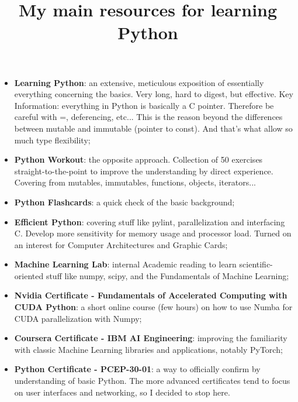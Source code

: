 \documentclass[10pt]{article}
\title {My main resources for learning Python}
\begin{document}
\maketitle

\begin{itemize}

\item{\textbf{Learning Python}}:
an extensive, meticulous exposition of essentially everything concerning
the basics. Very long, hard to digest, but effective.
Key Information: everything in Python is basically a C pointer.
Therefore be careful with =, deferencing, etc...
This is the reason beyond the differences between mutable and
immutable (pointer to const).
And that's what allow so much type flexibility;

\item{\textbf{Python Workout}}:
the opposite approach. Collection of 50 exercises straight-to-the-point
to improve the understanding by direct experience.
Covering from mutables, immutables, functions, objects, iterators...

\item{\textbf{Python Flashcards}}:
a quick check of the basic background;

\item{\textbf{Efficient Python}}:
covering stuff like pylint, parallelization and interfacing C.
Develop more sensitivity for memory usage and processor load.
Turned on an interest for Computer Architectures and Graphic Cards;

\item{\textbf{Machine Learning Lab}}:
internal Academic reading to learn scientific-oriented stuff like numpy, scipy,
and the Fundamentals of Machine Learning;

\item{\textbf{Nvidia Certificate -
 Fundamentals of Accelerated Computing with CUDA Python}}:
a short online course (few hours) on how to use
Numba for CUDA parallelization with Numpy;

\item{\textbf{Coursera Certificate - IBM AI Engineering}}:
improving the familiarity with classic Machine Learning 
libraries and applications, notably PyTorch;

\item{\textbf{Python Certificate - PCEP-30-01}}:
a way to officially confirm by understanding of basic Python.
The more advanced certificates tend to focus on user interfaces
and networking, so I decided to stop here.

\end{itemize}
\end{document}
